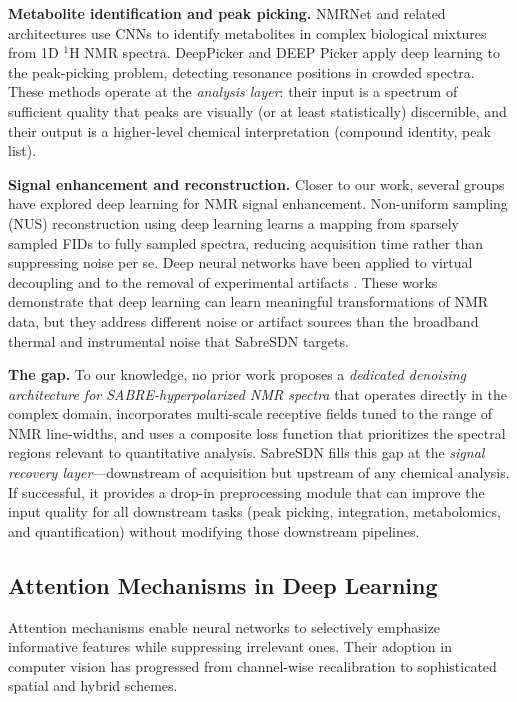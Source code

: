 \textbf{Metabolite identification and peak picking.}
NMRNet \cite{Le2019} and related architectures use CNNs to identify
metabolites in complex biological mixtures from 1D $^1$H NMR spectra.
DeepPicker \cite{Klukowski2020} and DEEP Picker \cite{Li2021} apply
deep learning to the peak-picking problem, detecting resonance positions
in crowded spectra. These methods operate at the \emph{analysis layer}:
their input is a spectrum of sufficient quality that peaks are visually
(or at least statistically) discernible, and their output is a higher-level
chemical interpretation (compound identity, peak list).

\textbf{Signal enhancement and reconstruction.}
Closer to our work, several groups have explored deep learning for NMR signal
enhancement. Non-uniform sampling (NUS) reconstruction using deep learning
\cite{Hyberts2012, Qu2015, Hansen2019} learns a mapping from sparsely
sampled FIDs to fully sampled spectra, reducing acquisition time rather
than suppressing noise per se. Deep neural networks have been applied to
virtual decoupling \cite{Karunanithy2021} and to the removal of experimental
artifacts \cite{Cobas2024}. These works demonstrate that deep learning can
learn meaningful transformations of NMR data, but they address different
noise or artifact sources than the broadband thermal and instrumental noise
that SabreSDN targets.

\textbf{The gap.}
To our knowledge, no prior work proposes a \emph{dedicated denoising
architecture for SABRE-hyperpolarized NMR spectra} that operates directly
in the complex domain, incorporates multi-scale receptive fields tuned to
the range of NMR line-widths, and uses a composite loss function that
prioritizes the spectral regions relevant to quantitative analysis.
SabreSDN fills this gap at the \emph{signal recovery layer}---downstream
of acquisition but upstream of any chemical analysis. If successful, it
provides a drop-in preprocessing module that can improve the input quality
for all downstream tasks (peak picking, integration, metabolomics, and
quantification) without modifying those downstream pipelines.

\subsection{Attention Mechanisms in Deep Learning}
\label{sec:rw_attention}

Attention mechanisms enable neural networks to selectively emphasize
informative features while suppressing irrelevant ones. Their adoption
in computer vision has progressed from channel-wise recalibration to
sophisticated spatial and hybrid schemes.

